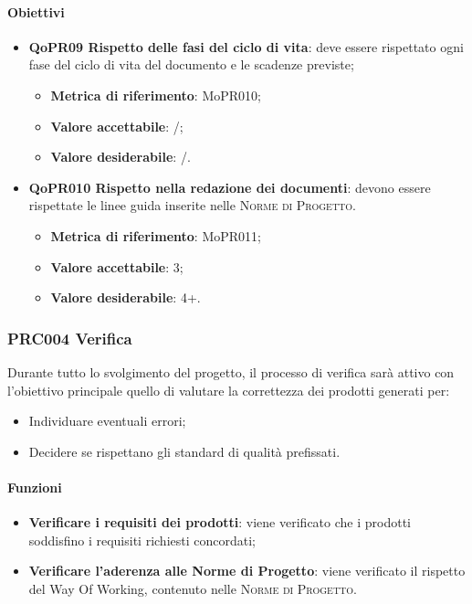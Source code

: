 \documentclass[../piano-di-qualifica.tex]{subfiles}
\begin{document}
\paragraph{Obiettivi}
\label{sub:obiettivi_3}
\begin{itemize}
    \item \textbf{QoPR09 Rispetto delle fasi del ciclo di vita}: deve essere rispettato ogni fase del ciclo di vita del documento e le scadenze previste;
        \begin{itemize}
            \item \textbf{Metrica di riferimento}: MoPR010;
            \item \textbf{Valore accettabile}: /; %
            \item \textbf{Valore desiderabile}: /.
        \end{itemize}
    \item \textbf{QoPR010 Rispetto nella redazione dei documenti}: devono essere rispettate le linee guida inserite nelle \textsc{Norme di Progetto}.
        \begin{itemize}
            \item \textbf{Metrica di riferimento}: MoPR011;
            \item \textbf{Valore accettabile}: 3; %
            \item \textbf{Valore desiderabile}: 4+.
        \end{itemize}
\end{itemize}

\subsubsection{PRC004 Verifica}
\label{sub:produzione_dei_documenti}
Durante tutto lo svolgimento del progetto, il processo di verifica sarà attivo con l'obiettivo principale quello di valutare la correttezza dei prodotti generati per: 
\begin{itemize}
    \item Individuare eventuali errori;
    \item Decidere se rispettano gli standard di qualità prefissati.
\end{itemize}

\paragraph{Funzioni}
\label{sub:funzioni_4}
\begin{itemize}
    \item \textbf{Verificare i requisiti dei prodotti}: viene verificato che i prodotti soddisfino i requisiti richiesti concordati;
    \item \textbf{Verificare l'aderenza alle Norme di Progetto}: viene verificato il rispetto del Way Of Working, contenuto nelle \textsc{Norme di Progetto}.
\end{itemize}
\end{document}
